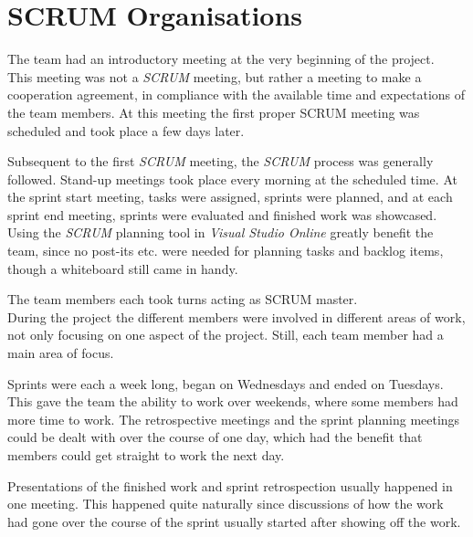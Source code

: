 \section{SCRUM Organisations}

The team had an introductory meeting at the very beginning of the project. \\
This meeting was not a \textit{SCRUM} meeting, but rather a meeting to make a cooperation agreement, in compliance with the available time and expectations of the team members.
At this meeting the first proper SCRUM meeting was scheduled and took place a few days later.

Subsequent to the first \textit{SCRUM} meeting, the \textit{SCRUM} process was generally followed.
Stand-up meetings took place every morning at the scheduled time. At the sprint start meeting, tasks were assigned, sprints were planned, and at each sprint end meeting, sprints were evaluated and finished work was showcased. \\
Using the \textit{SCRUM} planning tool in \textit{Visual Studio Online} greatly benefit the team, since no post-its etc. were needed for planning tasks and backlog items, though a whiteboard still came in handy.

The team members each took turns acting as SCRUM master.\\
During the project the different members were involved in different areas of work, not only focusing on one aspect of the project. Still, each team member had a main area of focus.

Sprints were each a week long, began on Wednesdays and ended on Tuesdays.\\
This gave the team the ability to work over weekends, where some members had more time to work. The retrospective meetings and the sprint planning meetings could be dealt with over the course of one day, which had the benefit that members could get straight to work the next day.

Presentations of the finished work and sprint retrospection usually happened in one meeting. This happened quite naturally since discussions of how the work had gone over the course of the sprint usually started after showing off the work.
